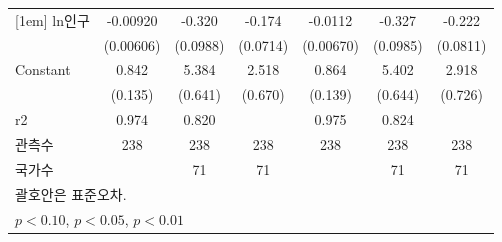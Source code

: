 \begin{table}[htbp]
{\begin{tabular}{l*{6}{c}}
[1em]
ln인구            &    -0.00920         &      -0.320\sym{***}&      -0.174\sym{**} &     -0.0112\sym{*}  &      -0.327\sym{***}&      -0.222\sym{***}\\
                    &   (0.00606)         &    (0.0988)         &    (0.0714)         &   (0.00670)         &    (0.0985)         &    (0.0811)         \\
[1em]
Constant            &       0.842\sym{***}&       5.384\sym{***}&       2.518\sym{***}&       0.864\sym{***}&       5.402\sym{***}&       2.918\sym{***}\\
                    &     (0.135)         &     (0.641)         &     (0.670)         &     (0.139)         &     (0.644)         &     (0.726)         \\
\hline
r2                  &       0.974         &       0.820         &                     &       0.975         &       0.824         &                     \\
관측수                   &         238         &         238         &         238         &         238         &         238         &         238         \\
국가수                 &                     &          71         &          71         &                     &          71         &          71         \\
\hline\hline
\multicolumn{7}{l}{\footnotesize 괄호안은 표준오차.}\\
\multicolumn{7}{l}{\footnotesize \sym{*} \(p<0.10\), \sym{**} \(p<0.05\), \sym{***} \(p<0.01\)}\\
\end{tabular}}
\end{table}
